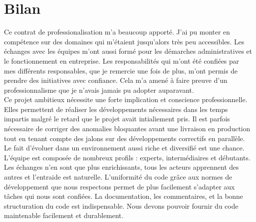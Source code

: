 \documentclass[12pt,a4paper]{article}
\begin{document}
\section{Bilan}
Ce contrat de professionalisation m'a beaucoup apporté. J'ai pu monter en compétence sur des domaines qui m'étaient jusqu'alors très peu accessibles. Les échanges avec les équipes m'ont aussi formé pour les démarches administratives et le fonctionnement en entreprise. Les responsabilités qui m'ont été confiées par mes différents responsables, que je remercie une fois de plus, m'ont permis de prendre des initiatives avec confiance. Cela m'a amené à faire preuve d'un professionnalisme que je n'avais jamais pu adopter auparavant.\\
Ce projet ambitieux nécessite une forte implication et conscience professionnelle. Elles permettent de réaliser les développements nécessaires dans les temps impartis malgré le retard que le projet avait intialiement pris. Il est parfois nécessaire de corriger des anomalies bloquantes avant une livraison en production tout en tenant compte des jalons sur des développements correctifs en parallèle.\\
Le fait d'évoluer dans un environnement aussi riche et diversifié est une chance. L'équipe est composée de nombreux profils : experts, intermédiaires et débutants. Les échanges n'en sont que plus enrichissants, tous les acteurs apprennent des autres et l'entraide est naturelle.
L'uniformité du code grâce aux normes de développement que nous respectons permet de plus facilement s'adapter aux tâches qui nous sont confiées.
La documentation, les commentaires, et la bonne structuration du code est indispensable. Nous devons pouvoir fournir du code maintenable facilement et durablement.
\newpage
\clearpage
\end{document}
